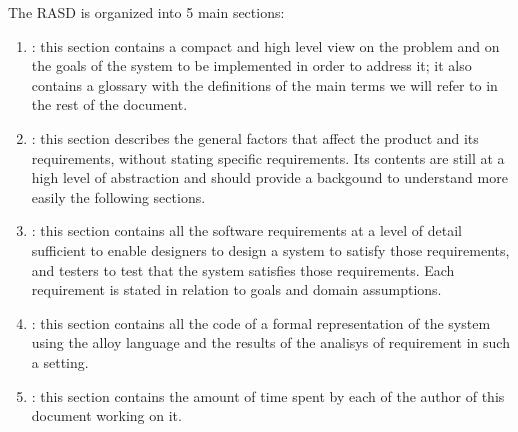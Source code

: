 The RASD is organized into 5 main sections:

\begin{enumerate}
\item {}: this section contains a compact and high level view on the problem and on the goals of the system to be implemented in order to address it; it also contains a glossary with the definitions of the main terms we will refer to in the rest of the document.
\item {}: this section  describes the general factors that affect the product and its requirements, without stating specific requirements. Its contents are still at a high level of abstraction and should provide a backgound to understand more easily the following sections.
\item {}: this section contains all the software requirements at a level of detail sufficient to enable designers to design a system to satisfy those requirements, and testers to test that the system satisfies those requirements. Each requirement is stated in relation to goals and domain assumptions.
\item {}: this section contains all the code of a formal representation of the system using the alloy language and the results of the analisys of requirement in such a setting.
\item {}: this section contains the amount of time spent by each of the author of this document working on it.
\end{enumerate}